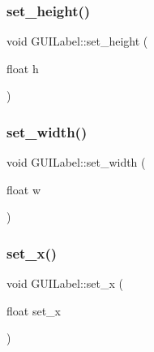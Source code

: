 \hypertarget{class_g_u_i_label_ada3b44dba6446d9159e394360a480847}{}\label{class_g_u_i_label_ada3b44dba6446d9159e394360a480847} 
\subsubsection{\texorpdfstring{set\+\_\+height()}{set\_height()}}
{\footnotesize\ttfamily void G\+U\+I\+Label\+::set\+\_\+height (\begin{DoxyParamCaption}\item[{float}]{h }\end{DoxyParamCaption})}

\hypertarget{class_g_u_i_label_a7d1513ef0f3b75fb17165b0a2ef077f3}{}\label{class_g_u_i_label_a7d1513ef0f3b75fb17165b0a2ef077f3} 
\subsubsection{\texorpdfstring{set\+\_\+width()}{set\_width()}}
{\footnotesize\ttfamily void G\+U\+I\+Label\+::set\+\_\+width (\begin{DoxyParamCaption}\item[{float}]{w }\end{DoxyParamCaption})}

\hypertarget{class_g_u_i_label_a94ff861ea98f1ba34d3795ae8db00776}{}\label{class_g_u_i_label_a94ff861ea98f1ba34d3795ae8db00776} 
\subsubsection{\texorpdfstring{set\+\_\+x()}{set\_x()}}
{\footnotesize\ttfamily void G\+U\+I\+Label\+::set\+\_\+x (\begin{DoxyParamCaption}\item[{float}]{set\+\_\+x }\end{DoxyParamCaption})}

\hypertarget{class_g_u_i_label_a207dfc2274970c99eb0a92fa2170da90}{}\label{class_g_u_i_label_a207dfc2274970c99eb0a92fa2170da90} 
